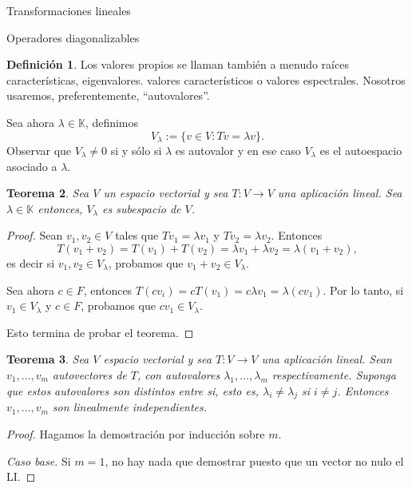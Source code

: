 \documentclass[a4paper,12pt,twoside,spanish,reqno]{amsbook}
\numberwithin{equation}{section}
\newtheorem{teorema}{Teorema}[section]
\theoremstyle{definition}
\newtheorem{definicion}[teorema]{Definici\'on}
\theoremstyle{remark}
\newcommand{\K}{\mathbb K}
\begin{document}
\begin{chapter}{Transformaciones lineales}
\begin{section}{Operadores diagonalizables}
\begin{definicion}
            Los valores propios se llaman también a menudo raíces características, eigenvalores. valores característicos o valores espectrales. Nosotros usaremos, preferentemente, ``autovalores''.
            
            Sea ahora $\lambda \in \K$, definimos
            $$
            V_\lambda := \{v \in V: Tv = \lambda v \}.
            $$
            Observar que $V_\lambda \ne 0$ si y sólo si $\lambda$ es autovalor y en ese caso $V_\lambda$  es el autoespacio asociado a $\lambda$. 
        \end{definicion}
        
        
        \begin{teorema}
            Sea $V$ un espacio vectorial y sea $T:V \to V$ una aplicación lineal. Sea $\lambda \in \K$ entonces, $V_\lambda$  es subespacio de $V$.
        \end{teorema}
        \begin{proof}
            Sean $v_1,v_2 \in V$ tales que $Tv_1 = \lambda v_1$ y $Tv_2 = \lambda v_2$. Entonces
            $$
            T(v_1+v_2) = T(v_1)+ T(v_2) = \lambda v_1 + \lambda v_2 = \lambda (v_1 + v_2),
            $$
            es decir si  $v_1,v_2 \in V_\lambda$, probamos que $v_1+v_2 \in V_\lambda$. 
            
            Sea ahora $c \in F$, entonces $T(cv_i) = cT(v_1) = c\lambda v_1 = \lambda (cv_1)$. Por lo tanto, si  $v_1\in V_\lambda$ y $c \in F$, probamos que $cv_1 \in V_\lambda$.
            
            Esto termina de probar el teorema.
        \end{proof}

        
        
        \begin{teorema}
            Sea $V$ espacio vectorial y sea $T: V \to V$ una aplicación lineal.  Sean $v_1,\ldots,v_m$ autovectores de $T$, con autovalores $\lambda_1,\ldots,\lambda_m$ respectivamente. Suponga que estos  autovalores son distintos entre si, esto es, $\lambda_i \ne \lambda_j$ si $i \ne j$. Entonces $v_1,\ldots,v_m$ son linealmente independientes.
        \end{teorema}
        \begin{proof}
            Hagamos la demostración por inducción sobre $m$.
            
            \textit{Caso base.} Si $m=1$, no hay nada que demostrar puesto que un vector no nulo el LI.
            
            \medskip
            

\end{proof}
\end{section}
\end{chapter}
\end{document}
